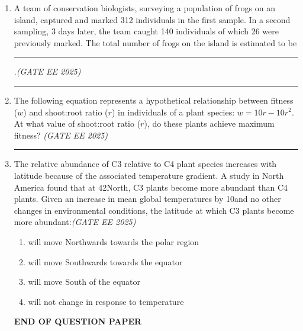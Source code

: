 \begin{enumerate}[leftmargin=*,label=\textbf{Q.\arabic*},resume]
\item A team of conservation biologists, surveying a population of frogs on an island, captured and marked 312 individuals in the first sample. In a second sampling, 3 days later, the team caught 140 individuals of which 26 were previously marked. The total number of frogs on the island is estimated to be \rule{4cm}{0.15mm}.\hfill \textit{(GATE EE 2025)}

\rule{4cm}{0.15mm}

\item The following equation represents a hypothetical relationship between fitness ($w$) and shoot:root ratio ($r$) in individuals of a plant species: $w = 10r-10r^2$. At what value of shoot:root ratio ($r$), do these plants achieve maximum fitness?
\hfill \textit{(GATE EE 2025)}
\rule{4cm}{0.15mm}

\item The relative abundance of C3 relative to C4 plant species increases with latitude because of the associated temperature gradient. A study in North America found that at 42\degree North, C3 plants become more abundant than C4 plants. Given an increase in mean global temperatures by 10\degree and no other changes in environmental conditions, the latitude at which C3 plants become more abundant:\hfill \textit{(GATE EE 2025)}
\begin{enumerate}[label=(\Alph*)]
\item will move Northwards towards the polar region
\item will move Southwards towards the equator
\item will move South of the equator
\item will not change in response to temperature
\end{enumerate}
\begin{center}
  \textbf{END OF QUESTION PAPER}  
\end{center}
\end{enumerate}



